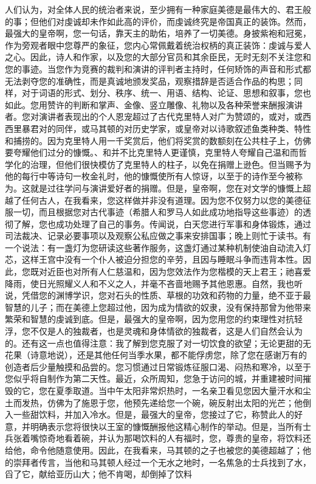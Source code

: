 人们认为，对全体人民的统治者来说，至少拥有一种家庭美德是最伟大的、君王般的事；但他们对虔诚却未作如此高的评价，而虔诚终究是帝国真正的装饰。然而，最强大的皇帝啊，您一句话，靠天主的助佑，培养了一切美德。身披紫袍和冠冕，作为旁观者眼中您尊严的象征，您内心常佩戴着统治权柄的真正装饰：虔诚与爱人之心。因此，诗人和作家，以及您的大部分官员和其余臣民，无时无刻不关注您和您的事迹。当您作为竞赛的裁判和演讲的评判者主持时，任何矫饰的声音和形式都无法剥夺您的准确性，而是真诚地颁发奖品，观察措辞是否适合作品的构思；同样，对于词语的形式、划分、秩序、统一、用语、结构、论证、思想和叙事，您也如此。您用赞许的判断和掌声、金像、竖立雕像、礼物以及各种荣誉来酬报演讲者。您对演讲者表现出的个人恩宠超过了古代克里特人对广为赞颂的，或对，或西西里暴君对的同伴，或马其顿的对历史学家，或皇帝对以诗歌叙述鱼类种类、特性和捕捞的。因为克里特人用一千奖赏后，他们将奖赏的数额刻在公共柱子上，仿佛要夸耀他们过分的慷慨。、和并不比克里特人更谨慎，克里特人夸耀自己温和而哲学化的治理，但他们很快模仿了克里特人的柱子，以免在捐赠上逊色。但当赐予为他的每行中等诗句一枚金礼时，他的慷慨使所有人惊讶，以至于的诗作至今被称为。这就是过往学问与演讲爱好者的捐赠。但是，皇帝啊，您在对文学的慷慨上超越了任何古人，在我看来，您这样做并非没有道理。因为您不仅努力以您的美德征服一切，而且根据您对古代事迹（希腊人和罗马人如此成功地指导这些事迹）的透彻了解，您也成功处理了自己的事务。传闻说，白天您进行军事和身体锻炼，通过司法裁决、记录必要事项以及观察公私应做之事来安排国事；晚上则忙于读书。有一个说法：有一盏灯为您研读这些著作服务，这盏灯通过某种机制使油自动流入灯芯，这样王宫中没有一个仆人被迫分担您的辛劳，且因与睡眠斗争而违背本性。因此，您既对近臣也对所有人仁慈温和，因为您效法作为您楷模的天上君王；祂喜爱降雨，使日光照耀义人和不义之人，并毫不吝啬地赐予其他恩惠。自然，我也听说，凭借您的渊博学识，您对石头的性质、草根的功效和药物的力量，绝不亚于最智慧的儿子；而在美德上您超过他，因为成为情欲的奴隶，没有保持那曾为他带来繁荣和智慧的虔诚到底。但是，最强大的皇帝啊，因为您用您的约束理性对抗轻浮，您不仅是人的独裁者，也是灵魂和身体情欲的独裁者，这是人们自然会认为的。还有这一点也值得注意：我了解到您克服了对一切饮食的欲望；无论更甜的无花果（诗意地说），还是其他任何当季水果，都不能俘虏您，除了您在感谢万有的创造者后少量触摸和品尝的。您习惯通过日常锻炼征服口渴、闷热和寒冷，以至于您似乎将自制作为第二天性。最近，众所周知，您急于访问的城，并重建被时间摧毁的它，您在夏季取道。当中午太阳非常炽热时，一名亲卫看见您因大量汗水和尘土而发热，仿佛为了施恩于您，他预先递给您一个碗，碗反射出太阳的光芒；他倒入一些甜饮料，并加入冷水。但是，最强大的皇帝，您接过了它，称赞此人的好意，并明确表示您将很快以王室的慷慨酬报他这精心制作的举动。但是，当所有士兵张着嘴惊奇地看着碗，并认为那喝饮料的人有福时，您，尊贵的皇帝，将饮料还给他，命令他随意使用。因此，在我看来，马其顿的之子也被您的美德超越了；他的崇拜者传言，当他和马其顿人经过一个无水之地时，一名焦急的士兵找到了水，舀了它，献给亚历山大；他不肯喝，却倒掉了饮料